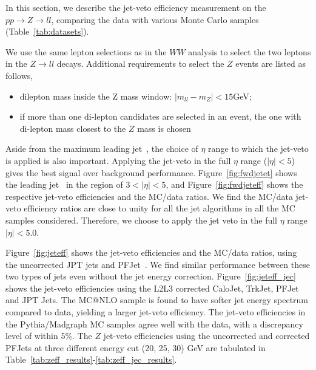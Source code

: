 In this section, we describe the jet-veto efficiency measurement on 
the $pp\to Z\to ll$, comparing the data with various Monte Carlo samples (Table~\ref{tab:datasets}). 

We use the same lepton selections as in the $WW$ analysis to select the 
two leptons in the $Z\to ll$ decays. 
Additional requirements to select the $Z$ events are listed as follows,
\begin{itemize}
\item dilepton mass inside the Z mass window: $|m_{ll} - m_Z|<15$GeV;
\item if more than one di-lepton candidates are selected in an event, the 
one with di-lepton mass closest to the $Z$ mass is chosen
\end{itemize}

Aside from the maximum leading jet \pt\,, the choice of $\eta$ range 
to which the jet-veto is applied is also important.
Applying the jet-veto in the full $\eta$ range ($|\eta|<5$) 
gives the best signal over background performance. 
Figure~\ref{fig:fwdjetet} shows the leading jet \pt\, in the 
region of $3<|\eta|<5$, and Figure~\ref{fig:fwdjeteff} 
shows the respective jet-veto efficiencies and the MC/data ratios. 
We find the MC/data jet-veto efficiency ratios are close to unity 
for all the jet algorithms in all the MC samples considered.
Therefore, we choose to apply the jet veto in the full 
$\eta$ range $|\eta|<5.0$.

Figure~\ref{fig:jeteff} shows the jet-veto efficiencies and 
the MC/data ratios, using the uncorrected JPT jets and PFJet~\cite{jetalgo}.
We find similar performance between these two types of jets even 
without the jet energy correction. 
Figure~\ref{fig:jeteff_jec} shows the jet-veto efficiencies 
using the L2L3 corrected CaloJet, TrkJet, PFJet and JPT Jets. 
The MC@NLO sample is found to have softer jet energy spectrum compared 
to data, yielding a larger jet-veto efficiency. 
The jet-veto efficiencies in the Pythia/Madgraph MC samples 
agree well with the data, with a discrepancy level of within 5\%. 
The $Z$ jet-veto efficiencies  using the uncorrected and 
corrected PFJets at three different energy cut (20, 25, 30) GeV 
are tabulated in Table~\ref{tab:zeff_results}-\ref{tab:zeff_jec_results}.

